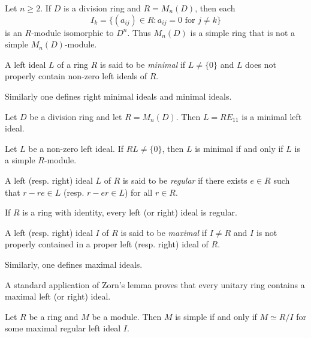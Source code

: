 \begin{example}
	\label{exa:I_k}
	Let $n\geq2$.  If $D$ is a division ring and $R=M_n(D)$, then each 
	\[
	I_k=\{ (a_{ij})\in R:a_{ij}=0\text{ for $j\ne k$}\}
	\]
	is an $R$-module isomorphic to $D^n$. 
	Thus $M_{n}(D)$ is a simple ring that is not a simple $M_n(D)$-module.
\end{example}

\begin{definition}
\label{def:minimal_left_ideal}
A left ideal $L$ of a ring $R$ is said to be \emph{minimal} if $L\ne\{0\}$ and 
$L$ does not properly contain non-zero left ideals of $R$. 
\end{definition}

Similarly one defines
right minimal ideals and minimal ideals. 

\begin{example}
	Let $D$ be a division ring and let $R=M_n(D)$. Then $L=RE_{11}$ 
	is a minimal left ideal.
\end{example}

\begin{example}
	Let $L$ be a non-zero left ideal. If $RL\ne\{0\}$, then
	$L$ is minimal if and only if $L$ is a simple $R$-module. 
\end{example}

\begin{definition}
\label{def:regular}
A left (resp. right) ideal $L$ of $R$ is said to be \emph{regular} if
there exists $e\in R$ such that $r-re\in L$ (resp.  $r-er\in L$) for all $r\in R$.
\end{definition}

If $R$ is a ring with identity, every left (or right) ideal is regular. 

\begin{definition}
A left (resp. right) ideal $I$ of $R$ is said to be \emph{maximal} if $I\ne R$ and $I$ is not properly contained 
in a proper left (resp. right) ideal of $R$. 
\end{definition}

Similarly, one defines maximal ideals. 

A standard application of Zorn's lemma proves 
that every unitary ring contains a maximal left (or right) ideal.  

\begin{proposition}
	\label{proposition:R/I}
	Let $R$ be a ring and $M$ be a module. Then $M$ is simple if and only if
	$M\simeq R/I$ for some maximal regular left ideal $I$. 	
\end{proposition}

